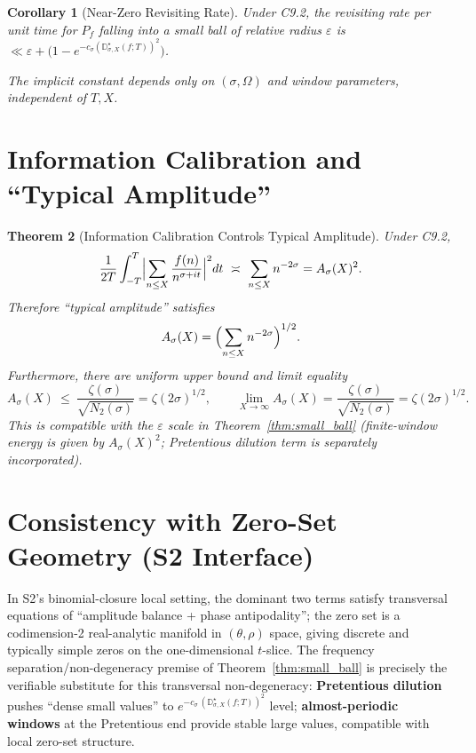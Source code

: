 \documentclass[11pt,a4paper]{article}
\newtheorem{theorem}{Theorem}[section]
\newtheorem{corollary}[theorem]{Corollary}
\theoremstyle{remark}
\begin{document}
\begin{corollary}[Near-Zero Revisiting Rate]\label{cor:revisiting}
Under C9.2, the revisiting rate per unit time for $P_f$ falling into a small ball of relative radius $\varepsilon$ is $\ll \varepsilon+\bigl(1-e^{-c_\sigma(\mathbb{D}^{\star}_{\sigma,X}(f;T))^2}\bigr)$.

The implicit constant depends only on $(\sigma,\Omega)$ and window parameters, independent of $T,X$.
\end{corollary}

\section{Information Calibration and ``Typical Amplitude''}

\begin{theorem}[Information Calibration Controls Typical Amplitude]\label{thm:typical_amplitude}
Under C9.2,
\begin{equation}
\frac{1}{2T}\int_{-T}^{T}\Bigl|\sum_{n\le X}\frac{f(n)}{n^{\sigma+it}}\Bigr|^2dt\ \asymp\ \sum_{n\le X}n^{-2\sigma}=A_\sigma(X)^2.
\end{equation}
Therefore ``typical amplitude'' satisfies
\begin{equation}
A_\sigma(X)=\Bigl(\sum_{n\le X}n^{-2\sigma}\Bigr)^{1/2}.
\end{equation}
Furthermore, there are uniform upper bound and limit equality
\begin{equation}
A_\sigma(X)\ \le\ \frac{\zeta(\sigma)}{\sqrt{N_2(\sigma)}}=\zeta(2\sigma)^{1/2},\qquad
\lim_{X\to\infty}A_\sigma(X)=\frac{\zeta(\sigma)}{\sqrt{N_2(\sigma)}}=\zeta(2\sigma)^{1/2}.
\end{equation}
This is compatible with the $\varepsilon$ scale in Theorem~\ref{thm:small_ball} (finite-window energy is given by $A_\sigma(X)^2$; Pretentious dilution term is separately incorporated).
\end{theorem}

\section{Consistency with Zero-Set Geometry (S2 Interface)}

In S2's binomial-closure local setting, the dominant two terms satisfy transversal equations of ``amplitude balance + phase antipodality''; the zero set is a codimension-2 real-analytic manifold in $(\theta,\rho)$ space, giving discrete and typically simple zeros on the one-dimensional $t$-slice. The frequency separation/non-degeneracy premise of Theorem~\ref{thm:small_ball} is precisely the verifiable substitute for this transversal non-degeneracy: \textbf{Pretentious dilution} pushes ``dense small values'' to $e^{-c_\sigma\,(\mathbb{D}^{\star}_{\sigma,X}(f;T))^2}$ level; \textbf{almost-periodic windows} at the Pretentious end provide stable large values, compatible with local zero-set structure.
\end{document}
